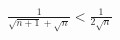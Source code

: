 \documentclass[preview]{standalone}
\begin{document}
\begin{align*}
\frac{1}{ \sqrt{n+1} + \sqrt{n} } < \frac{1}{2\sqrt{n}}
\end{align*}
\end{document}

